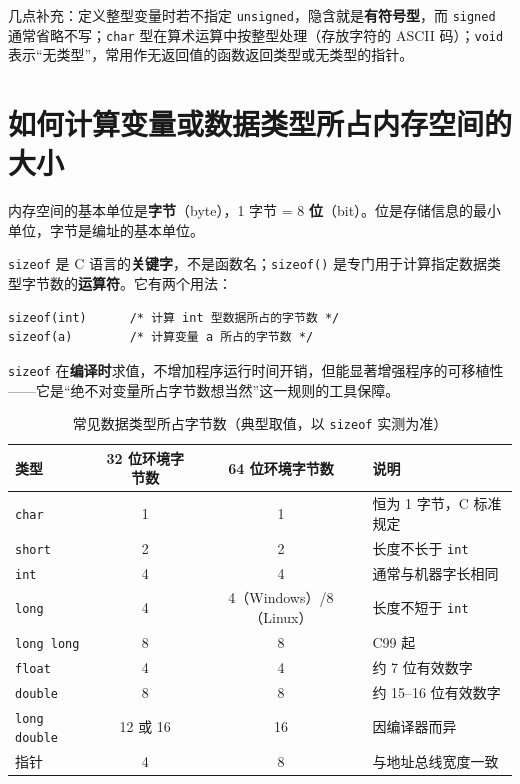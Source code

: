 几点补充：定义整型变量时若不指定 \texttt{unsigned}，隐含就是\textbf{有符号型}，而 \texttt{signed} 通常省略不写；\texttt{char} 型在算术运算中按整型处理（存放字符的 ASCII 码）；\texttt{void} 表示“无类型”，常用作无返回值的函数返回类型或无类型的指针。

\section{如何计算变量或数据类型所占内存空间的大小}

内存空间的基本单位是\textbf{字节}（byte），1 字节 = 8 \textbf{位}（bit）。位是存储信息的最小单位，字节是编址的基本单位。

\texttt{sizeof} 是 C 语言的\textbf{关键字}，不是函数名；\texttt{sizeof()} 是专门用于计算指定数据类型字节数的\textbf{运算符}。它有两个用法：

\begin{lstlisting}
sizeof(int)      /* 计算 int 型数据所占的字节数 */
sizeof(a)        /* 计算变量 a 所占的字节数 */
\end{lstlisting}

\texttt{sizeof} 在\textbf{编译时}求值，不增加程序运行时间开销，但能显著增强程序的可移植性——它是“绝不对变量所占字节数想当然”这一规则的工具保障。

\begin{table}[htbp]
\centering
\caption{常见数据类型所占字节数（典型取值，以 \texttt{sizeof} 实测为准）}
\small
\begin{tabularx}{\textwidth}{@{}lccX@{}}
\toprule
类型 & 32 位环境字节数 & 64 位环境字节数 & 说明 \\
\midrule
\texttt{char} & 1 & 1 & 恒为 1 字节，C 标准规定 \\
\texttt{short} & 2 & 2 & 长度不长于 \texttt{int} \\
\texttt{int} & 4 & 4 & 通常与机器字长相同 \\
\texttt{long} & 4 & 4（Windows）/8（Linux） & 长度不短于 \texttt{int} \\
\texttt{long long} & 8 & 8 & C99 起 \\
\texttt{float} & 4 & 4 & 约 7 位有效数字 \\
\texttt{double} & 8 & 8 & 约 15--16 位有效数字 \\
\texttt{long double} & 12 或 16 & 16 & 因编译器而异 \\
指针 & 4 & 8 & 与地址总线宽度一致 \\
\bottomrule
\end{tabularx}
\end{table}

